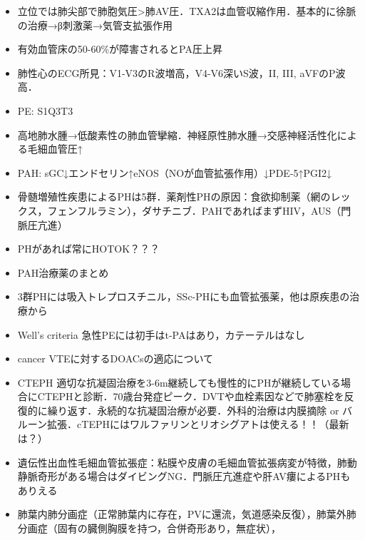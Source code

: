 \begin{itemize}
\item 立位では肺尖部で肺胞気圧>肺AV圧．TXA2は血管収縮作用．基本的に徐脈の治療→β刺激薬→気管支拡張作用
\item 有効血管床の50-60\%が障害されるとPA圧上昇
\item 肺性心のECG所見：V1-V3のR波増高，V4-V6深いS波，II, III, aVFのP波高．
\item PE: S1Q3T3
\item 高地肺水腫→低酸素性の肺血管攣縮．神経原性肺水腫→交感神経活性化による毛細血管圧↑
\item PAH: sGC↓エンドセリン↑eNOS（NOが血管拡張作用）↓PDE-5↑PGI2↓
\item 骨髄増殖性疾患によるPHは5群．薬剤性PHの原因：食欲抑制薬（網のレックス，フェンフルラミン），ダサチニブ．PAHであればまずHIV，AUS（門脈圧亢進）
\item PHがあれば常にHOTOK？？？
\item PAH治療薬のまとめ
\item 3群PHには吸入トレプロスチニル，SSc-PHにも血管拡張薬，他は原疾患の治療から
\item Well's criteria 急性PEには初手はt-PAはあり，カテーテルはなし
\item cancer VTEに対するDOACsの適応について
\item CTEPH 適切な抗凝固治療を3-6m継続しても慢性的にPHが継続している場合にCTEPHと診断．70歳台発症ピーク．DVTや血栓素因などで肺塞栓を反復的に繰り返す．永続的な抗凝固治療が必要．外科的治療は内膜摘除 or バルーン拡張．cTEPHにはワルファリンとリオシグアトは使える！！（最新は？）
\item 遺伝性出血性毛細血管拡張症：粘膜や皮膚の毛細血管拡張病変が特徴，肺動静脈奇形がある場合はダイビングNG．門脈圧亢進症や肝AV瘻によるPHもありえる
\item 肺葉内肺分画症（正常肺葉内に存在，PVに還流，気道感染反復），肺葉外肺分画症（固有の臓側胸膜を持つ，合併奇形あり，無症状），

\end{itemize}
